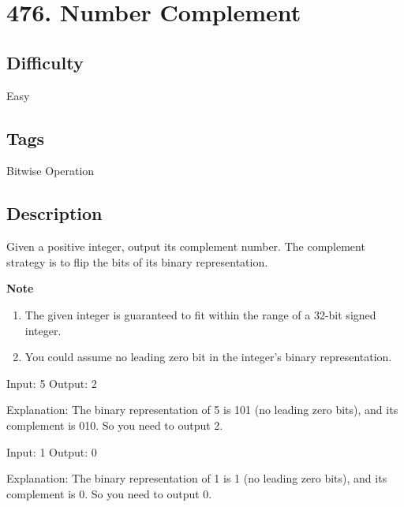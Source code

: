 \tocless\section{476. Number Complement}
\label{algo:476}

\subsection*{Difficulty}
Easy

\subsection*{Tags}
Bitwise Operation

\subsection*{Description}
Given a positive integer, output its complement number. The complement strategy is to flip the bits of its binary representation.

\textbf{Note}
\begin{enumerate}
\item The given integer is guaranteed to fit within the range of a 32-bit signed integer.
\item You could assume no leading zero bit in the integer's binary representation.
\end{enumerate}

\begin{example}
\begin{multilinecode}
Input: 5
Output: 2

Explanation: The binary representation of 5 is 101 (no leading zero bits), and its complement is 010. So you need to output 2.
\end{multilinecode}
\end{example}

\begin{example}
\begin{multilinecode}
Input: 1
Output: 0

Explanation: The binary representation of 1 is 1 (no leading zero bits), and its complement is 0. So you need to output 0.
\end{multilinecode}
\end{example}

